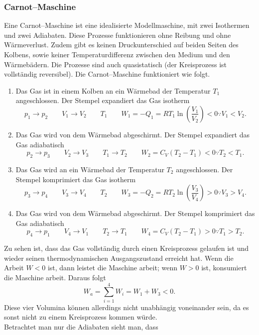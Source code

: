 \documentclass[a4paper,12pt]{article}
\begin{document}
\subsubsection{Carnot--Maschine}
Eine Carnot--Maschine ist eine idealisierte Modellmaschine, mit zwei Isothermen und zwei Adiabaten. Diese Prozesse funktionieren ohne Reibung und ohne Wärmeverlust. Zudem gibt es keinen Druckunterschied auf beiden Seiten des Kolbens, sowie keiner Temperaturdifferenz zwischen den Medium und den Wärmebädern. Die Prozesse sind auch quasistatisch (der Kreisprozess ist vollständig reversibel). Die Carnot--Maschine funktioniert wie folgt.
\begin{enumerate}[label=\arabic*.]
        \item Das Gas ist in einem Kolben an ein Wärmebad der Temperatur $T_1$ angeschlossen. Der Stempel expandiert das Gas isotherm
                \[ 
                        p_1\rightarrow p_2\qquad V_1\rightarrow V_2\qquad T_1\qquad W_1=-Q_1=RT_1\ln\left(\dfrac{V_1}{V_2}\right)<0\because V_1<V_2
                .\] 
        \item Das Gas wird von dem Wärmebad abgeschirmt. Der Stempel expandiert das Gas adiabatisch
                \[ 
                        p_2\rightarrow p_3\qquad V_2\rightarrow V_3\qquad T_1\rightarrow T_2\qquad W_2=C_V(T_2-T_1)<0\because T_2<T_1
                .\] 
        \item Das Gas wird an ein Wärmebad der Temperatur $T_2$ angeschlossen. Der Stempel komprimiert das Gas isotherm
                \[ 
                        p_3\rightarrow p_4\qquad V_3\rightarrow V_4\qquad T_2\qquad W_3=-Q_2=RT_2\ln\left(\dfrac{V_3}{V_4}\right)>0\because V_3>V_4
                .\] 
        \item Das Gas wird von dem Wärmebad abgeschirmt. Der Stempel komprimiert das Gas adiabatisch
                \[ 
                        p_4\rightarrow p_1\qquad V_4\rightarrow V_1\qquad T_2\rightarrow T_1\qquad W_4=C_V(T_2-T_1)>0\because T_1>T_2
                .\] 
\end{enumerate}
Zu sehen ist, dass das Gas vollständig durch einen Kreisprozess gelaufen ist und wieder seinen thermodynamischen Ausgangszustand erreicht hat. Wenn die Arbeit $W<0$ ist, dann leistet die Maschine arbeit; wenn $W>0$ ist, konsumiert die Maschine arbeit. Daraus folgt
\[ 
        W_a=\sum_{i=1}^{4}W_i=W_1+W_3<0
.\] 
Diese vier Volumina können allerdings nicht unabhängig voneinander sein, da es sonst nicht zu einem Kreisprozess kommen würde.\\\indent
Betrachtet man nur die Adiabaten sieht man, dass
\end{document}
